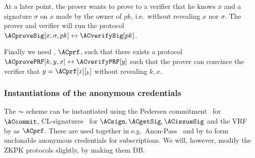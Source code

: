 At a later point, the prover wants to prove to a verifier that he knows \(x\) 
and a signature \(\sigma\) on \(x\) made by the owner of \(pk\), i.e.\ without 
revealing \(x\) nor \(\sigma\).
The prover and verifier will run the protocol \(\ACproveSig[x, \sigma, 
  pk]\leftrightarrow \ACverifySig[pk]\).


Finally we need , \(\ACprf\), such that there exists a protocol 
\(\ACprovePRF[k, y, x]\leftrightarrow \ACverifyPRF[y]\) such that the prover can 
convince the verifier that \(y = \ACprf[x][_k]\) without revealing \(k, x\).

{}


\subsubsection{Instantiations of the anonymous credentials} 

The \(\AC\) scheme can be instantiated using the Pedersen 
commitment~\cite{PedersenCommitment} for \(\ACcommit\),
CL-signatures~\cite{CLsignatures} for \(\ACsign, \ACgetSig, \ACissueSig\) and
the \ac{VRF} by \citet{DY-VRF} as \(\ACprf\).
These are used together in e.g.\ Anon-Pass~\cite{AnonPass} and by 
\citet{HowToWinTheCloneWars} to form unclonable anonymous credentials for 
subscriptions.
We will, however, modify the \ac{ZKPK} protocols slightly, by making them 
\acl{DB}.

